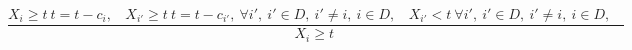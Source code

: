 $$\frac{X_{i} \geq t~t=t-c_{i},~~~~X_{i'} \geq t~t=t-c_{i'},~ \forall i',~i' \in D,~i' \neq i,~i \in D,~~~~X_{i'}<t~ \forall i',~i' \in D,~i' \neq i,~i \in D,~~~~}{X_{i} \geq t~}$$ 